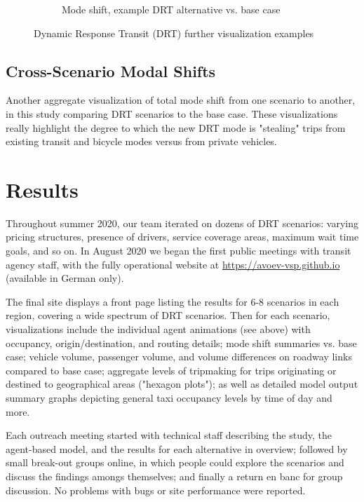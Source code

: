 \documentclass[3p,times,procedia]{elsarticle}
\begin{document}
\begin{figure}[ht]
\begin{subfigure}[c]{0.32\textwidth}
     \caption{Mode shift, example DRT alternative vs. base case}
     \label{fig:flyover}
  \end{subfigure}
  \caption{Dynamic Response Transit (DRT) further visualization examples}
\end{figure}

\subsection{Cross-Scenario Modal Shifts}

Another aggregate visualization of total mode shift from one scenario to another, in this study comparing DRT scenarios to the base case. These visualizations really highlight the degree to which the new DRT mode is "stealing" trips from existing transit and bicycle modes versus from private vehicles.


\section{Results}
\label{results}

Throughout summer 2020, our team iterated on dozens of DRT scenarios: varying pricing structures, presence of drivers, service coverage areas, maximum wait time goals, and so on. In August 2020 we began the first public meetings with transit agency staff, with the fully operational website at \url{https://avoev-vsp.github.io} (available in German only).

The final site displays a front page listing the results for 6-8 scenarios in each region, covering a wide spectrum of DRT scenarios. Then for each scenario, visualizations include the individual agent animations (see above) with occupancy, origin/destination, and routing details; mode shift summaries vs. base case; vehicle volume, passenger volume, and volume differences on roadway links compared to base case; aggregate levels of tripmaking for trips originating or destined to geographical areas ("hexagon plots"); as well as detailed model output summary graphs depicting general taxi occupancy levels by time of day and more.

Each outreach meeting started with technical staff describing the study, the agent-based model, and the results for each alternative in overview; followed by small break-out groups online, in which people could explore the scenarios and discuss the findings amongs themselves; and finally a return en banc for group discussion. No problems with bugs or site performance were reported.
\end{document}
